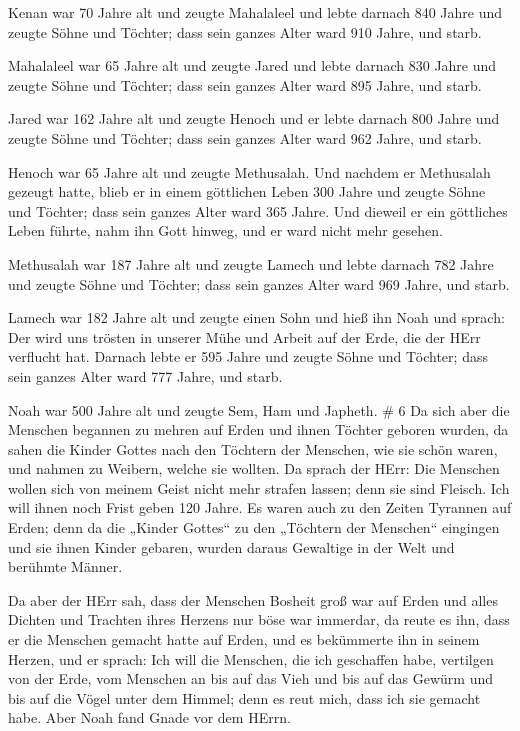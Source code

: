  Kenan war 70 Jahre alt und zeugte Mahalaleel 
und lebte darnach 840 Jahre und zeugte Söhne und Töchter; 
dass sein ganzes Alter ward 910 Jahre, und starb.

 Mahalaleel war 65 Jahre alt und zeugte Jared 
und lebte darnach 830 Jahre und zeugte Söhne und Töchter; 
dass sein ganzes Alter ward 895 Jahre, und starb.

 Jared war 162 Jahre alt und zeugte Henoch 
und er lebte darnach 800 Jahre und zeugte Söhne und Töchter;
 dass sein ganzes Alter ward 962 Jahre, und starb.

 Henoch war 65 Jahre alt und zeugte Methusalah.
 Und nachdem er Methusalah gezeugt hatte, blieb er in einem
göttlichen Leben 300 Jahre und zeugte Söhne und Töchter; 
dass sein ganzes Alter ward 365 Jahre.  Und dieweil er ein
göttliches Leben führte, nahm ihn Gott hinweg, und er ward nicht mehr
gesehen.

 Methusalah war 187 Jahre alt und zeugte Lamech
 und lebte darnach 782 Jahre und zeugte Söhne und Töchter;
 dass sein ganzes Alter ward 969 Jahre, und starb.

 Lamech war 182 Jahre alt und zeugte einen Sohn
 und hieß ihn Noah und sprach: Der wird uns trösten in
unserer Mühe und Arbeit auf der Erde, die der HErr verflucht hat.
 Darnach lebte er 595 Jahre und zeugte Söhne und Töchter;
 dass sein ganzes Alter ward 777 Jahre, und starb.

 Noah war 500 Jahre alt und zeugte Sem, Ham und Japheth. \#
6  Da sich aber die Menschen begannen zu mehren auf Erden
und ihnen Töchter geboren wurden,  da sahen die Kinder
Gottes nach den Töchtern der Menschen, wie sie schön waren, und nahmen
zu Weibern, welche sie wollten.  Da sprach der HErr: Die
Menschen wollen sich von meinem Geist nicht mehr strafen lassen; denn
sie sind Fleisch. Ich will ihnen noch Frist geben 120 Jahre.
 Es waren auch zu den Zeiten Tyrannen auf Erden; denn da die
„Kinder Gottes`` zu den „Töchtern der Menschen`` eingingen und sie ihnen
Kinder gebaren, wurden daraus Gewaltige in der Welt und berühmte Männer.

 Da aber der HErr sah, dass der Menschen Bosheit groß war
auf Erden und alles Dichten und Trachten ihres Herzens nur böse war
immerdar,  da reute es ihn, dass er die Menschen gemacht
hatte auf Erden, und es bekümmerte ihn in seinem Herzen, 
und er sprach: Ich will die Menschen, die ich geschaffen habe, vertilgen
von der Erde, vom Menschen an bis auf das Vieh und bis auf das Gewürm
und bis auf die Vögel unter dem Himmel; denn es reut mich, dass ich sie
gemacht habe.  Aber Noah fand Gnade vor dem HErrn.

